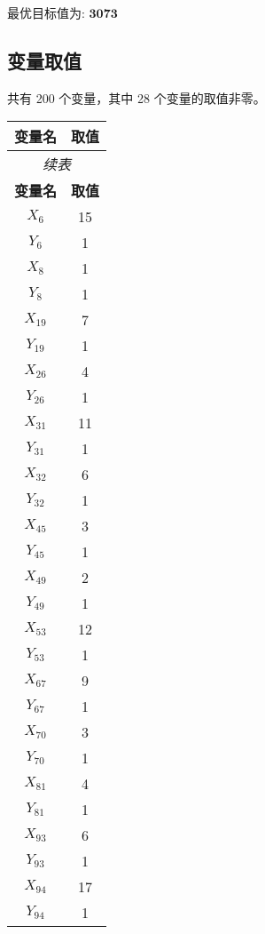 \documentclass[a4paper,10pt]{article}
\begin{document}
最优目标值为: $\mathbf{3073}$

\subsection{变量取值}

共有 200 个变量，其中 28 个变量的取值非零。

\begin{center}
\begin{longtable}{cc}
\toprule
\textbf{变量名} & \textbf{取值} \\
\midrule
\endfirsthead
\multicolumn{2}{c}{\textit{续表}} \\
\toprule
\textbf{变量名} & \textbf{取值} \\
\midrule
\endhead
\bottomrule
\endfoot
\bottomrule
\endlastfoot
$X_{6}$ & 15 \\
$Y_{6}$ & 1 \\
$X_{8}$ & 1 \\
$Y_{8}$ & 1 \\
$X_{19}$ & 7 \\
$Y_{19}$ & 1 \\
$X_{26}$ & 4 \\
$Y_{26}$ & 1 \\
$X_{31}$ & 11 \\
$Y_{31}$ & 1 \\
$X_{32}$ & 6 \\
$Y_{32}$ & 1 \\
$X_{45}$ & 3 \\
$Y_{45}$ & 1 \\
$X_{49}$ & 2 \\
$Y_{49}$ & 1 \\
$X_{53}$ & 12 \\
$Y_{53}$ & 1 \\
$X_{67}$ & 9 \\
$Y_{67}$ & 1 \\
$X_{70}$ & 3 \\
$Y_{70}$ & 1 \\
$X_{81}$ & 4 \\
$Y_{81}$ & 1 \\
$X_{93}$ & 6 \\
$Y_{93}$ & 1 \\
$X_{94}$ & 17 \\
$Y_{94}$ & 1 \\
\end{longtable}
\end{center}
\end{document}
